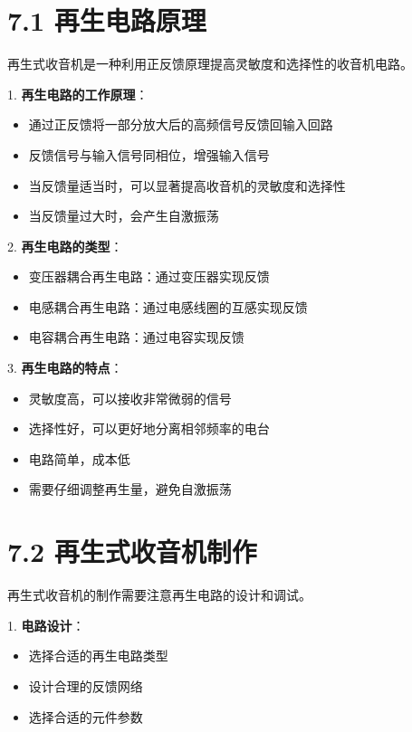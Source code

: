 \documentclass[12pt,UTF8]{ctexbook}
\begin{document}
\section*{7.1 再生电路原理}

再生式收音机是一种利用正反馈原理提高灵敏度和选择性的收音机电路。

1. \textbf{再生电路的工作原理}：
   \begin{itemize}[leftmargin=3.5em]
   \item 通过正反馈将一部分放大后的高频信号反馈回输入回路
   \item 反馈信号与输入信号同相位，增强输入信号
   \item 当反馈量适当时，可以显著提高收音机的灵敏度和选择性
   \item 当反馈量过大时，会产生自激振荡
   \end{itemize}

2. \textbf{再生电路的类型}：
   \begin{itemize}[leftmargin=3.5em]
   \item 变压器耦合再生电路：通过变压器实现反馈
   \item 电感耦合再生电路：通过电感线圈的互感实现反馈
   \item 电容耦合再生电路：通过电容实现反馈
   \end{itemize}

3. \textbf{再生电路的特点}：
   \begin{itemize}[leftmargin=3.5em]
   \item 灵敏度高，可以接收非常微弱的信号
   \item 选择性好，可以更好地分离相邻频率的电台
   \item 电路简单，成本低
   \item 需要仔细调整再生量，避免自激振荡
   \end{itemize}

\section*{7.2 再生式收音机制作}

再生式收音机的制作需要注意再生电路的设计和调试。

1. \textbf{电路设计}：
   \begin{itemize}[leftmargin=3.5em]
   \item 选择合适的再生电路类型
   \item 设计合理的反馈网络
   \item 选择合适的元件参数
   \end{itemize}
\end{document}
